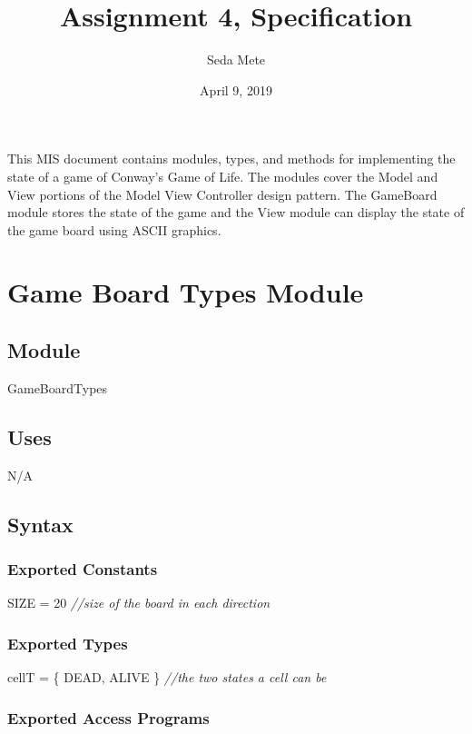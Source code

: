 \documentclass[12pt]{article}
\title{Assignment 4, Specification}
\author{Seda Mete}
\date{April 9, 2019}
\begin{document}
\maketitle

This MIS document contains modules, types, and methods for implementing the state of a game of Conway's Game of Life. The modules cover the Model and View portions of the Model View Controller design pattern. The GameBoard module stores the state of the game and the View module can display the state of the game board using ASCII graphics.

\newpage

\section* {Game Board Types Module}

\subsection*{Module}

GameBoardTypes

\subsection* {Uses}

N/A

\subsection* {Syntax}

\subsubsection* {Exported Constants}

SIZE = 20 {\it //size of the board in each direction}\\

\subsubsection* {Exported Types}

cellT = \{ DEAD, ALIVE \} {\it //the two states a cell can be}\\

\subsubsection* {Exported Access Programs}
\end{document}
